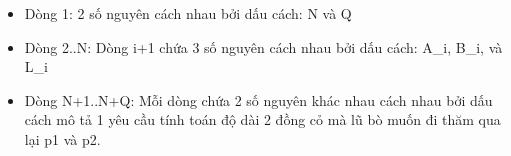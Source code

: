 \begin{itemize}
	\item     Dòng 1: 2 số nguyên cách nhau bởi dấu cách: N và Q   
	\item     Dòng 2..N: Dòng i+1 chứa 3 số nguyên cách nhau bởi dấu cách: A\_i,         B\_i, và L\_i   
	\item     Dòng N+1..N+Q: Mỗi dòng chứa 2 số nguyên khác nhau cách nhau bởi dấu cách         mô tả 1 yêu cầu tính toán độ dài 2 đồng cỏ mà lũ bò muốn đi thăm qua lại p1 và p2.   
\end{itemize}